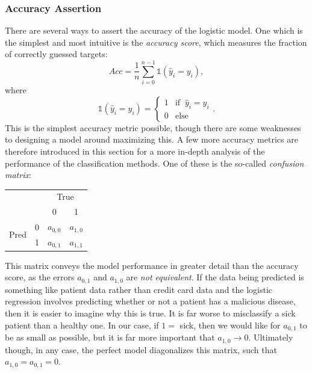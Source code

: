         \subsubsection{Accuracy Assertion}
            There are several ways to assert the accuracy of the logistic model. One which is the simplest and most intuitive is the \textit{accuracy score}, which measures the fraction of correctly guessed targets:
            \begin{equation}
                Acc = \frac1n\sum^{n-1}_{i=0} \mathds{1}(\hat{y}_i=y_i),
            \end{equation}
            where 
            \begin{equation}
                \mathds{1}(\hat{y}_i=y_i) = \begin{cases}1 & \text{if  }\ \hat{y}_i=y_i \\ 0 & \text{else}\end{cases}.
            \end{equation}
            This is the simplest accuracy metric possible, though there are some weaknesses to designing a model around maximizing this. A few more accuracy metrics are therefore introduced in this section for a more in-depth analysis of the performance of the classification methods. One of these is the so-called \textit{confusion matrix}:
            \begin{table}[H]
                \centering
                \begin{tabular}{cc|cc}
                     & & \multicolumn{2}{c}{True}\\
                     & & 0 & 1\\\hline
                    \multirow{ 2}{*}{Pred} & 0 & $a_{0,0}$ & $a_{1,0}$ \\
                     & 1 & $a_{0,1}$ & $a_{1,1}$
                \end{tabular}
            \end{table}
            This matrix conveys the model performance in greater detail than the accuracy score, as the errors $a_{0,1}$ and $a_{1,0}$ are \textit{not equivalent}. If the data being predicted is something like patient data rather than credit card data and the logistic regression involves predicting whether or not a patient has a malicious disease, then it is easier to imagine why this is true. It is far worse to misclassify a sick patient than a healthy one. In our case, if $1=$ sick, then we would like for $a_{0,1}$ to be as small as possible, but it is far more important that $a_{1,0}\rightarrow 0$. Ultimately though, in any case, the perfect model diagonalizes this matrix, such that $a_{1,0}=a_{0,1}=0$. \\\\
